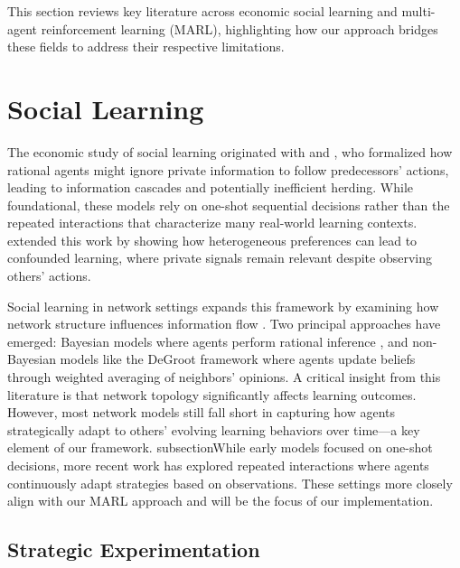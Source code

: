 This section reviews key literature across economic social learning and multi-agent reinforcement learning (MARL), highlighting how our approach bridges these fields to address their respective limitations.

\section{Social Learning}
The economic study of social learning originated with \citet{banerjee1992simple} and \citet{bikhchandani1992theory}, who formalized how rational agents might ignore private information to follow predecessors' actions, leading to information cascades and potentially inefficient herding. While foundational, these models rely on one-shot sequential decisions rather than the repeated interactions that characterize many real-world learning contexts. \citet{smith2000pathological} extended this work by showing how heterogeneous preferences can lead to confounded learning, where private signals remain relevant despite observing others' actions.

Social learning in network settings expands this framework by examining how network structure influences information flow \citep{acemoglu2011bayesian, golub2010naive}. Two principal approaches have emerged: Bayesian models where agents perform rational inference \citep{rosenberg2009informational, gale2003bayesian,mossel2015strategic}, and non-Bayesian models \citep{golub2010naive, demarzo2003persuasion} like the DeGroot framework \citep{degroot1974reaching} where agents update beliefs through weighted averaging of neighbors' opinions. A critical insight from this literature is that network topology significantly affects learning outcomes. However, most network models still fall short in capturing how agents strategically adapt to others' evolving learning behaviors over time—a key element of our framework. subsectionWhile early models focused on one-shot decisions, more recent work has explored repeated interactions where agents continuously adapt strategies based on observations. These settings more closely align with our MARL approach and will be the focus of our implementation.

\subsection{Strategic Experimentation}

